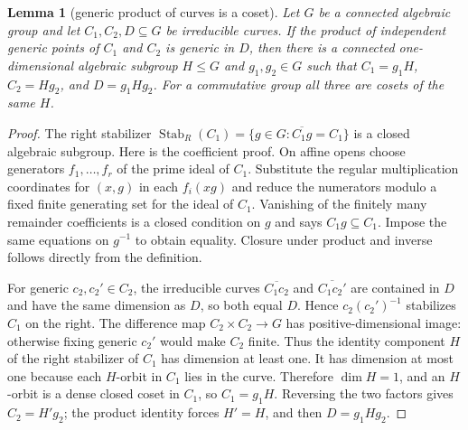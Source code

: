 \documentclass[11pt,oneside]{article}
\newtheorem{lemma}[theorem]{Lemma}
\theoremstyle{definition}
\theoremstyle{remark}
\newcommand{\Stab}{\operatorname{Stab}}
\begin{document}
\begin{lemma}[generic product of curves is a coset]\label{lem:curve-coset}
Let $G$ be a connected algebraic group and let $C_1,C_2,D\subseteq G$ be irreducible
curves.  If the product of independent generic points of $C_1$ and $C_2$ is generic in
$D$, then there is a connected one-dimensional algebraic subgroup $H\leq G$ and
$g_1,g_2\in G$ such that
$C_1=g_1H$, $C_2=Hg_2$, and $D=g_1Hg_2$.  For a commutative group all three are cosets
of the same $H$.
\end{lemma}
\begin{proof}
The right stabilizer
$\Stab_R(C_1)=\{g\in G:\overline{C_1g}=C_1\}$ is a closed algebraic subgroup.  Here is
the coefficient proof.  On affine opens choose generators $f_1,\ldots,f_r$ of the prime
ideal of $C_1$.  Substitute the regular multiplication coordinates for $(x,g)$ in each
$f_i(xg)$ and reduce the numerators modulo a fixed finite generating set for the ideal of
$C_1$.  Vanishing of the finitely many remainder coefficients is a closed condition on
$g$ and says $C_1g\subseteq C_1$.  Impose the same equations on $g^{-1}$ to obtain
equality.  Closure under product and inverse follows directly from the definition.

For generic $c_2,c_2'\in C_2$, the irreducible curves
$\overline{C_1c_2}$ and $\overline{C_1c_2'}$ are contained in $D$ and have the same
dimension as $D$, so both equal $D$.  Hence
$c_2(c_2')^{-1}$ stabilizes $C_1$ on the right.  The difference map
$C_2\times C_2\to G$ has positive-dimensional image: otherwise fixing generic $c_2'$
would make $C_2$ finite.  Thus the identity component $H$ of the right stabilizer of
$C_1$ has dimension at least one.  It has dimension at most one because each $H$-orbit
in $C_1$ lies in the curve.  Therefore $\dim H=1$, and an $H$-orbit is a dense closed
coset in $C_1$, so $C_1=g_1H$.  Reversing the two factors gives $C_2=H'g_2$; the product
identity forces $H'=H$, and then $D=g_1Hg_2$.
\end{proof}
\end{document}
